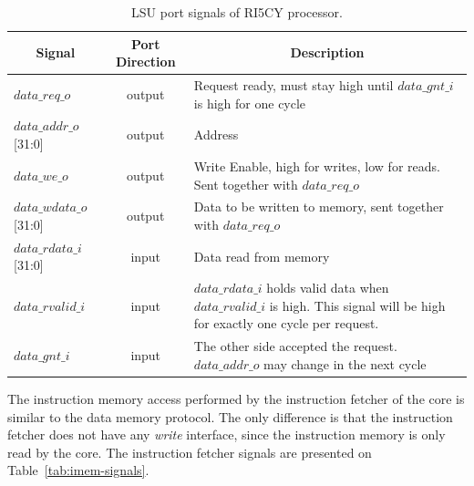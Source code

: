 \begin{table}[htb!] 
	\centering 
	\caption{LSU port signals of RI5CY processor\cite{manual-ri5cy}.} 
	\label{tab:lsu-signals}
	\begin{tabular}{l|c|p{7cm}} 
		\multicolumn{1}{c}{\bfseries Signal} & \multicolumn{1}{c}{\bfseries Port Direction} & \multicolumn{1}{c}{\bfseries Description} \\     
		\hline	
		$data\_req\_o$  &  output & Request ready, must stay high until $data\_gnt\_i$ is        high for one cycle \\
		\hline
		$data\_addr\_o$[31:0]  &  output & Address \\
		\hline
		$data\_we\_o$  &  output & Write Enable, high for writes, low for reads. Sent            together with $data\_req\_o$ \\
		\hline
		$data\_wdata\_o$[31:0]  &  output & Data to be written to memory, sent together with     $data\_req\_o$ \\
		\hline
		$data\_rdata\_i$[31:0]  &  input & Data read from memory \\
		\hline
		$data\_rvalid\_i$  &  input & $data\_rdata\_i$ holds valid data when                     $data\_rvalid\_i$ is high. This signal will be high for exactly one cycle per        request. \\
		\hline
		$data\_gnt\_i$  &  input & The other side accepted the request. $data\_addr\_o$ may     change in the next cycle \\
		\hline
	\end{tabular} 
\end{table}

The instruction memory access performed by the instruction fetcher of the core is similar to the data memory protocol. The only difference is that the instruction fetcher does not have any \textit{write} interface, since the instruction memory is only read by the core. The instruction fetcher signals are presented on Table~\ref{tab:imem-signals}.

